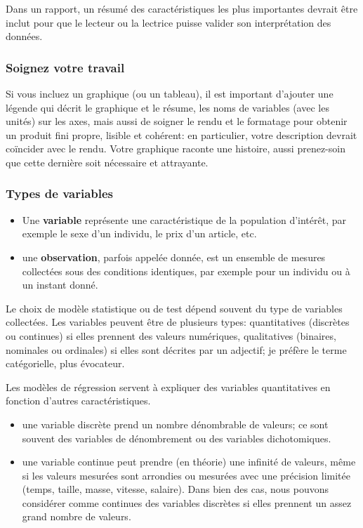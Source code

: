 \documentclass[
  11pt,
  letterpaper,
]{article}
\providecommand{\tightlist}{%
  \setlength{\itemsep}{0pt}\setlength{\parskip}{0pt}}
\theoremstyle{definition}
\theoremstyle{definition}
\theoremstyle{definition}
\theoremstyle{definition}
\theoremstyle{remark}
\begin{document}
Dans un rapport, un résumé des caractéristiques les plus importantes devrait être inclut pour que le lecteur ou la lectrice puisse valider son interprétation des données.

\hypertarget{soignez-votre-travail}{%
\subsubsection{Soignez votre travail}\label{soignez-votre-travail}}

Si vous incluez un graphique (ou un tableau), il est important d'ajouter une légende qui décrit le graphique et le résume, les noms de variables (avec les unités) sur les axes, mais aussi de soigner le rendu et le formatage pour obtenir un produit fini propre, lisible et cohérent: en particulier, votre description devrait coïncider avec le rendu. Votre graphique raconte une histoire, aussi prenez-soin que cette dernière soit nécessaire et attrayante.

\hypertarget{types-de-variables}{%
\subsubsection{Types de variables}\label{types-de-variables}}

\begin{itemize}
\tightlist
\item
  Une \textbf{variable} représente une caractéristique de la population d'intérêt, par exemple le sexe d'un individu, le prix d'un article, etc.
\item
  une \textbf{observation}, parfois appelée donnée, est un ensemble de mesures collectées sous des conditions identiques, par exemple pour un individu ou à un instant donné.
\end{itemize}

Le choix de modèle statistique ou de test dépend souvent du type de variables collectées. Les variables peuvent être de plusieurs types: quantitatives (discrètes ou continues) si elles prennent des valeurs numériques, qualitatives (binaires, nominales ou ordinales) si elles sont décrites par un adjectif; je préfère le terme catégorielle, plus évocateur.

Les modèles de régression servent à expliquer des variables quantitatives en fonction d'autres caractéristiques.

\begin{itemize}
\tightlist
\item
  une variable discrète prend un nombre dénombrable de valeurs; ce sont souvent des variables de dénombrement ou des variables dichotomiques.
\item
  une variable continue peut prendre (en théorie) une infinité de valeurs, même si les valeurs mesurées sont arrondies ou mesurées avec une précision limitée (temps, taille, masse, vitesse, salaire). Dans bien des cas, nous pouvons considérer comme continues des variables discrètes si elles prennent un assez grand nombre de valeurs.
\end{itemize}
\end{document}
